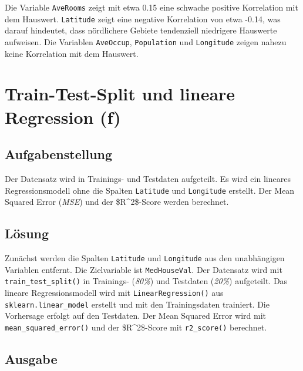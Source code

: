 Die Variable \texttt{AveRooms} zeigt mit etwa 0.15 eine schwache positive Korrelation mit dem Hauswert. \texttt{Latitude} zeigt eine negative Korrelation von etwa -0.14, was darauf hindeutet, dass nördlichere Gebiete tendenziell niedrigere Hauswerte aufweisen. Die Variablen \texttt{AveOccup}, \texttt{Population} und \texttt{Longitude} zeigen nahezu keine Korrelation mit dem Hauswert.

\cleardoublepage


\section{Train-Test-Split und lineare Regression (f)}
\label{sec:2f}

\subsection{Aufgabenstellung}

Der Datensatz wird in Trainings- und Testdaten aufgeteilt. Es wird ein lineares Regressionsmodell ohne die Spalten \texttt{Latitude} und \texttt{Longitude} erstellt. Der Mean Squared Error (\textit{\acs{MSE}}) und der \acs{$R^2$-Score} werden berechnet.

\subsection{Lösung}

Zunächst werden die Spalten \texttt{Latitude} und \texttt{Longitude} aus den unabhängigen Variablen entfernt. Die Zielvariable ist \texttt{MedHouseVal}. Der Datensatz wird mit \texttt{train\_test\_split()} in Trainings- (\textit{80\%}) und Testdaten (\textit{20\%}) aufgeteilt. Das lineare Regressionsmodell wird mit \texttt{LinearRegression()} aus \texttt{sklearn.linear\_model} erstellt und mit den Trainingsdaten trainiert. Die Vorhersage erfolgt auf den Testdaten. Der Mean Squared Error wird mit \texttt{mean\_squared\_error()} und der \acs{$R^2$-Score} mit \texttt{r2\_score()} berechnet.



\subsection{Ausgabe}

